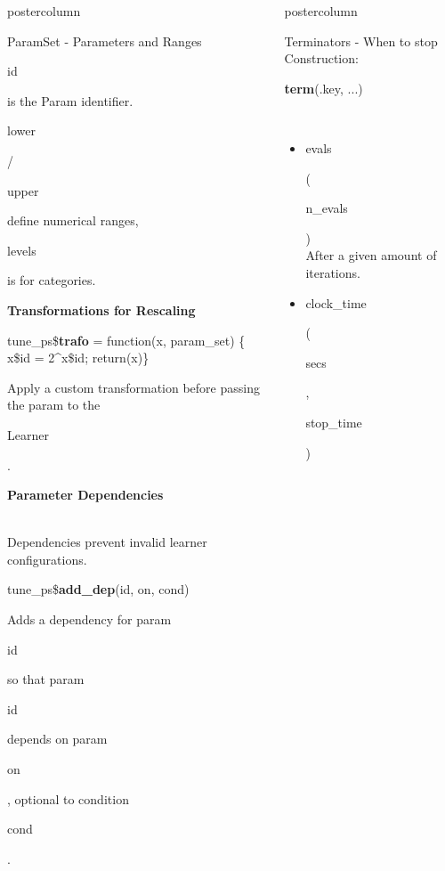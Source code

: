 \documentclass{beamer}
\newlength{\columnheight} %
\newcommand{\codeinline}[1]{\begin{codeboxinline}#1\end{codeboxinline}}
\newcommand{\sectionheading}[1]{{\color{mlrblue}\large\raggedright\textbf{#1}}\vspace{1em}}
\begin{document}
\begin{frame}[fragile]{}
\begin{columns}
\begin{column}{.245\textwidth}
\begin{beamercolorbox}[center]{postercolumn}
\begin{minipage}{.98\textwidth}
{\begin{myblock}{ParamSet - Parameters and Ranges}
							\codeinline{id} is the Param identifier.
							\codeinline{lower}/\codeinline{upper} define numerical ranges, \codeinline{levels} is for categories.
							\vspace{1em}
							\\
							\sectionheading{Transformations for Rescaling}
							\begin{codeboxmultiline}[width=25.5cm]
								tune\_ps\$\textbf{trafo} = function(x, param\_set) \{\\
								\hspace*{1ex}x\$id =  2\^{}x\$id; return(x)\}
							\end{codeboxmultiline}
							Apply a custom transformation before passing the param to the \codeinline{Learner}.
							\vspace{1em}
							\\
							\sectionheading{Parameter Dependencies}
							\\
							Dependencies prevent invalid learner configurations.
							\\
							\begin{codebox}
								tune\_ps\$\textbf{add\_dep}(id, on, cond)
							\end{codebox}
							Adds a dependency for param \codeinline{id} so that param \codeinline{id} depends on param \codeinline{on}, optional to condition \codeinline{cond}.
						\end{myblock}
						\vfill}
				\end{minipage}
			\end{beamercolorbox}
		\end{column}
		\begin{column}{.245\textwidth}
			\begin{beamercolorbox}[center]{postercolumn}
				\begin{minipage}{.98\textwidth}
					\parbox[t][\columnheight]{\textwidth}{
						\begin{myblock}{Terminators - When to stop}
							Construction: \codeinline{\textbf{term}(.key, ...)}
							\\
							\begin{itemize}
								\item \codeinline{evals}
								      (\codeinline{n\_evals})\\
								      After a given amount of iterations.
								\item \codeinline{clock\_time}
								      (\codeinline{secs}, \codeinline{stop\_time})\\

\end{itemize}
\end{myblock}}
\end{minipage}
\end{beamercolorbox}
\end{column}
\end{columns}
\end{frame}
\end{document}
